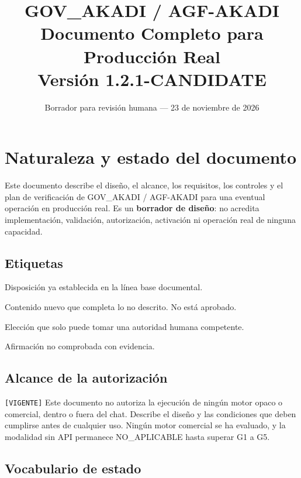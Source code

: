 \documentclass[12pt]{article}
\title{
\textbf{GOV\_AKADI / AGF-AKADI}\\
\large Documento Completo para Producción Real\\
\normalsize Versión 1.2.1-CANDIDATE
}
\date{Borrador para revisión humana --- 23 de noviembre de 2026}
\begin{document}
\maketitle

\section{Naturaleza y estado del documento}

Este documento describe el diseño, el alcance, los requisitos, los
controles y el plan de verificación de GOV\_AKADI / AGF-AKADI para una
eventual operación en producción real. Es un \textbf{borrador de diseño}:
no acredita implementación, validación, autorización, activación ni
operación real de ninguna capacidad.

\subsection{Etiquetas}

\begin{description}[leftmargin=4.2cm, style=nextline]
    \item[\texttt{[VIGENTE]}] Disposición ya establecida en la línea base documental.
    \item[\texttt{[PROPUESTA]}] Contenido nuevo que completa lo no descrito. No está aprobado.
    \item[\texttt{[DECISIÓN PENDIENTE]}] Elección que solo puede tomar una autoridad humana competente.
    \item[\texttt{[SIN VERIFICAR]}] Afirmación no comprobada con evidencia.
\end{description}

\subsection{Alcance de la autorización}

\texttt{[VIGENTE]} Este documento no autoriza la ejecución de ningún motor
opaco o comercial, dentro o fuera del chat. Describe el diseño y las condiciones
que deben cumplirse antes de cualquier uso. Ningún motor comercial se ha
evaluado, y la modalidad sin API permanece NO\_APLICABLE hasta superar G1 a G5.

\subsection{Vocabulario de estado}
\end{document}
